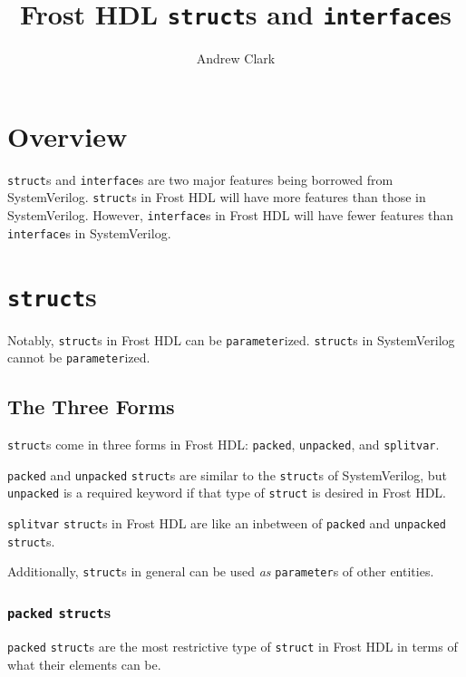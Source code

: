 \documentclass{article}
\title{Frost HDL \texttt{struct}s and \texttt{interface}s}
\author{Andrew Clark}
\begin{document}
	\maketitle
	\newpage


	\doublespacing

	\section{Overview}
	\texttt{struct}s and \texttt{interface}s are two major features being
	borrowed from SystemVerilog.  \texttt{struct}s in Frost HDL will
	have more features than those in SystemVerilog.  However,
	\texttt{interface}s in Frost HDL will have fewer features than
	\texttt{interface}s in SystemVerilog.


	\section{\texttt{struct}s}
	Notably, \texttt{struct}s in Frost HDL can be \texttt{parameter}ized.
	\texttt{struct}s in SystemVerilog cannot be \texttt{parameter}ized.


	\subsection{The Three Forms}
	\texttt{struct}s come in three forms in Frost HDL:  \texttt{packed},
	\texttt{unpacked}, and \texttt{splitvar}.

	\texttt{packed} and \texttt{unpacked} \texttt{struct}s are similar to
	the \texttt{struct}s of SystemVerilog, but \texttt{unpacked} is a
	required keyword if that type of \texttt{struct} is desired in Frost
	HDL.

	\texttt{splitvar} \texttt{struct}s in Frost HDL are like an inbetween
	of \texttt{packed} and \texttt{unpacked} \texttt{struct}s.

	Additionally, \texttt{struct}s in general can be used \textit{as}
	\texttt{parameter}s of other entities.

	\subsubsection{\texttt{packed} \texttt{struct}s}
	\texttt{packed} \texttt{struct}s are the most restrictive type of
	\texttt{struct} in Frost HDL in terms of what their elements can be.
\end{document}

